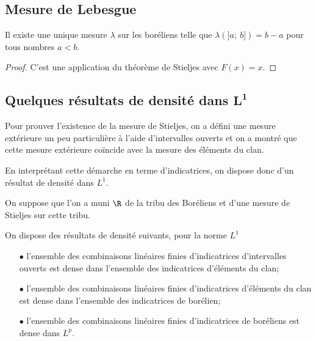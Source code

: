 \subsection{Mesure de Lebesgue}

\begin{prop}
Il existe une unique mesure $\lambda$ sur les boréliens telle que $\lambda(]a;~b]) = b-a$ pour tous nombres $a<b$.
\end{prop}

\begin{proof}
C'est une application du théorème de Stieljes avec $F(x)=x$.
\end{proof}

\subsection{Quelques résultats de densité dans $\mathbf{L^1}$}

Pour prouver l'existence de la mesure de Stieljes, on a défini une mesure extérieure un peu particulière à l'aide d'intervalles ouverts et on a montré que cette mesure extérieure coïncide avec la mesure des éléments du clan.

En interprétant cette démarche en terme d'indicatrices, on dispose donc d'un résultat de densité dans $L^1$.

\begin{prop}
\label{densite_intervalles}
On suppose que l'on a muni $\R$ de la tribu des Boréliens et d'une mesure de Stieljes sur cette tribu.

On dispose des résultats de densité suivants, pour la norme $L^1$
\begin{itemize}
\item[$\bullet$] l'ensemble des combinaisons linéaires finies d'indicatrices d'intervalles ouverts est dense dans l'ensemble des indicatrices d'éléments du clan;
\item[$\bullet$] l'ensemble des combinaisons linéaires finies d'indicatrices d'éléments du clan est dense dans l'ensemble des indicatrices de borélien;
\item[$\bullet$] l'ensemble des combinaisons linéaires finies d'indicatrices de boréliens est dense dans $L^p$.
\end{itemize}
\end{prop}


